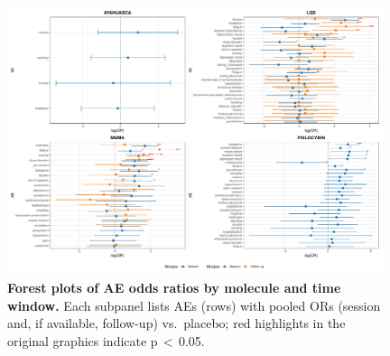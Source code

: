 \begin{figure}[htb]
  \centering
  \includegraphics[width=0.98\textwidth]{figures/forest_combined_all_molecules.pdf}
  \caption{\textbf{Forest plots of AE odds ratios by molecule and time window.}
  Each subpanel lists AEs (rows) with pooled ORs (session and, if available, follow-up) vs.\ placebo; red highlights in the original graphics indicate p\,$<\,$0.05.}
  \label{fig:forest-combined}
\end{figure}


\begin{table}[!h]
\centering
\caption{\label{tab:ae-transition}
\textbf{Temporal status of significant adverse events (AEs) by molecule.}
AEs are classified as Transient (session-only), Emergent (follow-up-only), or Persistent (present in both windows).}
\end{table}


